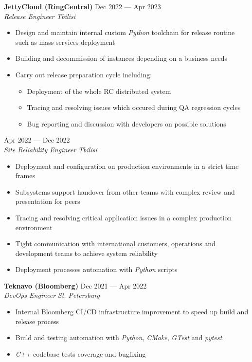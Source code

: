 \documentclass[10pt]{report}
\newenvironment{JobDescription}[5]{
    \vspace{ #5 }
    \flushleft
    {\bf #1 } \hfill { #2 }
    \\
    {\em #3 } \hfill {\em #4 }
    \begin{itemize}
} {
    \end{itemize}
}
\begin{document}
\begin{JobDescription}{JettyCloud (RingCentral)}{Dec 2022 --- Apr 2023}{Release Engineer}{Tbilisi}{2mm}
    \item Design and maintain internal custom \emph{Python} toolchain for release routine such as mass services
        deployment
    \item Building and decommission of instances depending on a business needs
    \item Carry out release preparation cycle including:
    \begin{itemize}
        \item Deployment of the whole RC distributed system
        \item Tracing and resolving issues which occured during QA regression cycles
        \item Bug reporting and discussion with developers on possible solutions
    \end{itemize}
\end{JobDescription}

\begin{JobDescription}{}{Apr 2022 --- Dec 2022}{Site Reliability Engineer}{Tbilisi}{-3mm}
    \item Deployment and configuration on production environments in a strict time frames
    \item Subsystems support handover from other teams with complex review and presentation for peers
    \item Tracing and resolving critical application issues in a complex production environment
    \item Tight communication with international customers, operations and development teams to achieve system reliability
    \item Deployment processes automation with \emph{Python} scripts
\end{JobDescription}

\begin{JobDescription}{Teknavo (Bloomberg)}{Dec 2021 --- Apr 2022}{DevOps Engineer}{St. Petersburg}{5mm}
    \item Internal Bloomberg CI/CD infrastructure improvement to speed up build and release process
    \item Build and testing automation with \emph{Python}, \emph{CMake}, \emph{GTest} and \emph{pytest}
    \item \emph{C++} codebase tests coverage and bugfixing
\end{JobDescription}
\end{document}
